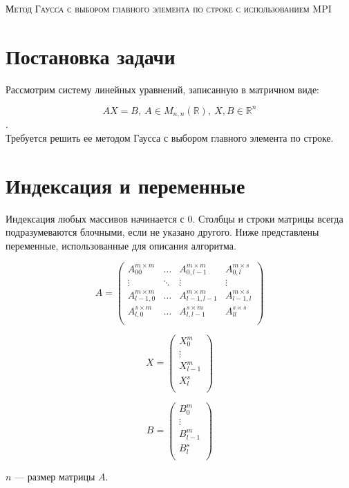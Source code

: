 \documentclass[11pt]{article}
\begin{document}
\begin{center}

\textsc{Метод Гаусса с выбором главного элемента по строке с использованием MPI}

\end{center}
\enlargethispage{9\baselineskip}
\section{Постановка задачи}
Рассмотрим систему линейных уравнений, записанную в матричном виде:

$$AX = B,\ A \in M_{n,n}(\mathbb{R}),\ X, B \in \mathbb{R}^{n}$$.
\\
Требуется решить ее методом Гаусса с выбором главного элемента по строке.
\section{Индексация и переменные}
Индексация любых массивов начинается с 0.
Столбцы и строки матрицы всегда подразумеваются блочными, если не указано другого. 
Ниже представлены переменные, использованные для описания алгоритма.

$$A = 
\begin{pmatrix}
A^{m\times m}_{00} 	      &\ldots & A^{m\times m}_{0,l-1} & A^{m\times s}_{0,l}\\
\vdots             		  &\ddots & \vdots              & \vdots\\
A^{m\times m}_{l-1,0}   &\ldots & A^{m\times m}_{l-1,l-1}& A^{m\times s}_{l-1,l}\\
A^{s\times m}_{l, 0}  &\ldots & A^{s\times m}_{l,l-1}& A^{s\times s}_{ll}\\
\end{pmatrix}
$$

$$
X = 
\begin{pmatrix}
X_0^m\\
\vdots\\
X_{l-1}^m\\
X_l^s\\
\end{pmatrix}
$$

$$
B=
\begin{pmatrix}
B_0^m\\
\vdots\\
B_{l-1}^m\\
B_l^s\\
\end{pmatrix}
$$

$n$ --- размер матрицы $A$.
\end{document}
